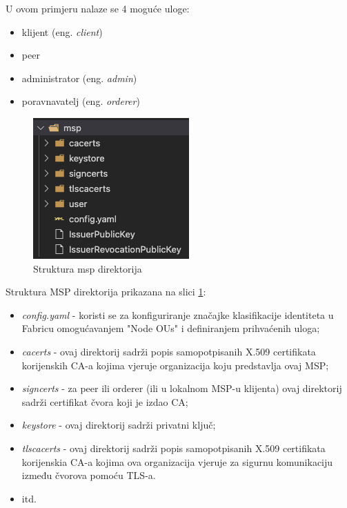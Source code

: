 \documentclass[times, utf8, diplomski]{fer}
\begin{document}
U ovom primjeru nalaze se 4 moguće uloge:
\begin{itemize}
\item klijent (eng.  \textit{client})
\item peer
\item administrator (eng.  \textit{admin})
\item poravnavatelj (eng.  \textit{orderer})
\end{itemize}

\begin{figure}[htb]
\centering
\includegraphics{imgs/msp-folder.png}
\caption{Struktura msp direktorija}
\label{fig:msp}
\end{figure}

Struktura MSP direktorija prikazana na slici \ref{fig:msp}:

\begin{itemize}
\item \textit{config.yaml} - koristi se za konfiguriranje značajke klasifikacije identiteta u Fabricu omogućavanjem "Node OUs" i definiranjem prihvaćenih uloga;
\item \textit{cacerts} - ovaj direktorij sadrži popis samopotpisanih X.509 certifikata korijenskih CA-a kojima vjeruje organizacija koju predstavlja ovaj MSP;
\item \textit{signcerts} - za peer ili orderer (ili u lokalnom MSP-u klijenta) ovaj direktorij sadrži certifikat čvora koji je izdao CA;
\item \textit{keystore} - ovaj direktorij sadrži privatni ključ;
\item \textit{tlscacerts} - ovaj direktorij sadrži popis samopotpisanih X.509 certifikata korijenskia CA-a kojima ova organizacija vjeruje za sigurnu komunikaciju između čvorova pomoću TLS-a.
\item itd.
\end{itemize}
\end{document}
